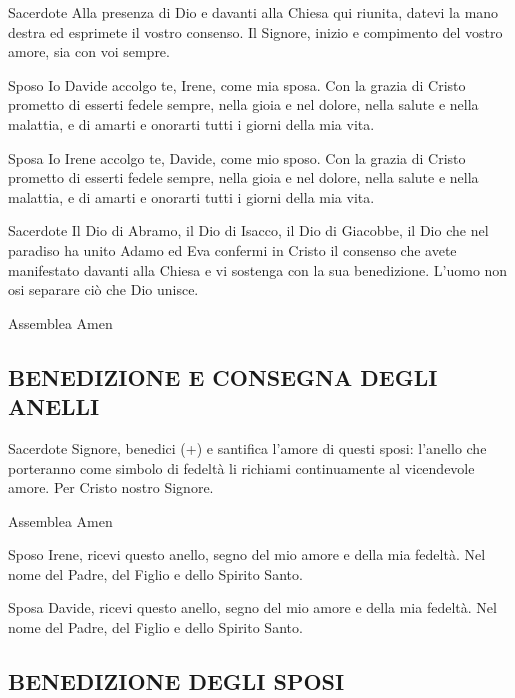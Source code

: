 \begin{dialoghi}
\item[Sacerdote] Alla presenza di Dio e davanti alla Chiesa qui riunita, datevi la mano destra ed esprimete il vostro consenso. Il Signore, inizio e compimento del vostro amore, sia con voi sempre.
\item[Sposo] Io Davide accolgo te, Irene, come mia sposa. Con la grazia di Cristo prometto di esserti fedele sempre, nella gioia e nel dolore, nella salute e nella malattia, e di amarti e onorarti tutti i giorni della mia vita.
\item[Sposa] Io Irene accolgo te, Davide, come mio sposo. Con la grazia di Cristo prometto di esserti fedele sempre, nella gioia e nel dolore, nella salute e nella malattia, e di amarti e onorarti tutti i giorni della mia vita.
\item[Sacerdote] Il Dio di Abramo, il Dio di Isacco, il Dio di Giacobbe, il Dio che nel paradiso ha unito Adamo ed Eva confermi in Cristo il consenso che avete manifestato davanti alla Chiesa e vi sostenga con la sua benedizione. L'uomo non osi separare ciò che Dio unisce.
\item[Assemblea] Amen
\end{dialoghi}

\subsection*{BENEDIZIONE E CONSEGNA DEGLI ANELLI}

\begin{dialoghi}
\item[Sacerdote] Signore, benedici (+) e santifica l'amore di questi sposi: l'anello che porteranno come simbolo di fedeltà li richiami continuamente al vicendevole amore. Per Cristo nostro Signore.
\item[Assemblea] Amen
\item[Sposo] Irene, ricevi questo anello, segno del mio amore e della mia fedeltà. Nel nome del Padre, del Figlio e dello Spirito Santo.
\item[Sposa] Davide, ricevi questo anello, segno del mio amore e della mia fedeltà. Nel nome del Padre, del Figlio e dello Spirito Santo.
\end{dialoghi}

\subsection*{BENEDIZIONE DEGLI SPOSI}

